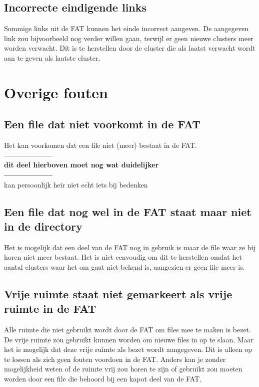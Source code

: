 \documentclass[11pt]{article}
\begin{document}
	\subsection{Incorrecte eindigende links}\label{sec:links}
	Sommige links uit de FAT kunnen het einde incorrect aangeven. De aangegeven link zou bijvoorbeeld nog verder willen gaan, terwijl er geen nieuwe clusters meer worden verwacht. Dit is te herstellen door de cluster die als laatst verwacht wordt aan te geven als laatste cluster.

	\newpage

	\section{Overige fouten}\label{sec:overige}
	\subsection{Een file dat niet voorkomt in de FAT}\label{sec:dir}
	Het kan voorkomen dat een file niet (meer) bestaat in de FAT.\\
\textbf{------------------\\dit deel hierboven moet nog wat duidelijker \\------------------}\\
kan persoonlijk heir niet echt iets bij bedenken 

	\subsection{Een file dat nog wel in de FAT staat maar niet in de directory}\label{sec:fat}
	Het is mogelijk dat een deel van de FAT nog in gebruik is maar de file waar ze bij horen niet meer bestaat. Het is niet eenvoudig om dit te herstellen omdat het aantal clusters waar het om gaat niet bekend is, aangezien er geen file meer is.

	\subsection{Vrije ruimte staat niet gemarkeert als vrije ruimte in de FAT}\label{sec:vrij}
	Alle ruimte die niet gebruikt wordt door de FAT om files mee te maken is bezet. De vrije ruimte zou gebruikt kunnen worden om nieuwe files in op te slaan. Maar het is mogelijk dat deze vrije ruimte als bezet wordt aangegeven. Dit is alleen op te lossen als zich geen fouten voordoen in de FAT. Anders kan je zonder mogelijkheid weten of de ruimte vrij zou horen te zijn of gebruikt zou moeten worden door een file die behoord bij een kapot deel van de FAT.
\end{document}
